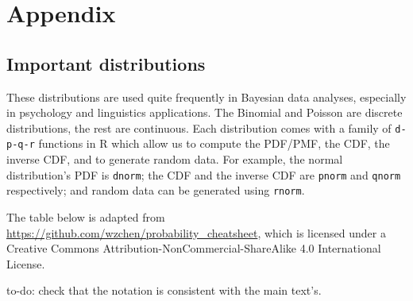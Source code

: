 \documentclass[12pt,]{krantz}
\theoremstyle{definition}
\theoremstyle{definition}
\theoremstyle{definition}
\theoremstyle{remark}
\begin{document}
\part{Appendix}\label{part-appendix}

\chapter{Important distributions}\label{important-distributions}

These distributions are used quite frequently in Bayesian data analyses,
especially in psychology and linguistics applications. The Binomial and
Poisson are discrete distributions, the rest are continuous. Each
distribution comes with a family of \texttt{d-p-q-r} functions in R
which allow us to compute the PDF/PMF, the CDF, the inverse CDF, and to
generate random data. For example, the normal distribution's PDF is
\texttt{dnorm}; the CDF and the inverse CDF are \texttt{pnorm} and
\texttt{qnorm} respectively; and random data can be generated using
\texttt{rnorm}.

The table below is adapted from
\url{https://github.com/wzchen/probability_cheatsheet}, which is
licensed under a Creative Commons Attribution-NonCommercial-ShareAlike
4.0 International License.

to-do: check that the notation is consistent with the main text's.

\small
\end{document}
